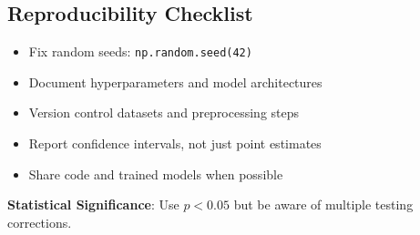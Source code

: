 \documentclass[11pt,letterpaper]{article}
\begin{document}
\subsection{Reproducibility Checklist}
\begin{itemize}
    \item Fix random seeds: \texttt{np.random.seed(42)}
    \item Document hyperparameters and model architectures
    \item Version control datasets and preprocessing steps
    \item Report confidence intervals, not just point estimates
    \item Share code and trained models when possible
\end{itemize}

\textbf{Statistical Significance}: Use $p < 0.05$ but be aware of multiple testing corrections.

 
\end{document}
